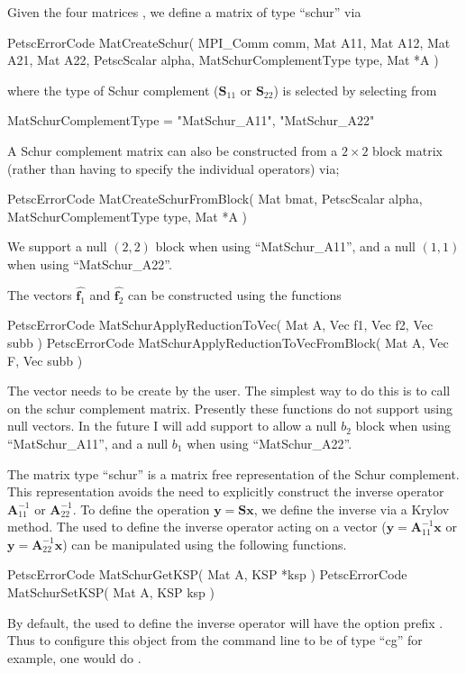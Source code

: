 \documentclass[10pt,a4paper]{amsart}
\renewcommand{\v}[1]{\boldsymbol{#1}}		%
\newcommand{\m}[1]{\boldsymbol{#1}}		%
\newcommand{\code}[1]{{\fontfamily{txtt}\selectfont {#1}}}
\begin{document}
Given the four matrices \code{A11, A12, A21, A22}, we define a matrix of type ``schur'' via
\begin{verbatimtab}[4]
	PetscErrorCode MatCreateSchur( MPI_Comm comm, 
		Mat A11, Mat A12, Mat A21, Mat A22, 
		PetscScalar alpha, MatSchurComplementType type, Mat *A )
\end{verbatimtab}
where the type of Schur complement ($\m S_{11}$ or $\m S_{22}$) is selected by selecting from 
\begin{verbatimtab}[4]
	MatSchurComplementType = { "MatSchur_A11", "MatSchur_A22" }
\end{verbatimtab}
A Schur complement matrix can also be constructed from a $2 \times 2$ block matrix (rather than having to specify the individual operators) via;
\begin{verbatimtab}[4]
	PetscErrorCode MatCreateSchurFromBlock( Mat bmat, PetscScalar alpha, 
		MatSchurComplementType type, Mat *A )
\end{verbatimtab}
We support a null $(2,2)$ block when using ``MatSchur\_A11'',  and a null $(1,1)$ when using ``MatSchur\_A22''.

The vectors $\hat{\v f_1}$ and $\hat{\v f_2}$ can be constructed using the functions
\begin{verbatimtab}[4]
	PetscErrorCode MatSchurApplyReductionToVec( Mat A, Vec f1, Vec f2, Vec subb )
	PetscErrorCode MatSchurApplyReductionToVecFromBlock( Mat A, Vec F, Vec subb )
\end{verbatimtab}
The vector \code{subb} needs to be create by the user. The simplest way to do this is to call \code{MatGetVecs(schur, PETSC\_NULL, \&subb )} on the schur complement matrix. 
Presently these functions do not support using null vectors. In the future I will add support to allow a null  $b_2$ block when using ``MatSchur\_A11'',  and a null $b_1$ when using ``MatSchur\_A22''.

The matrix type ``schur'' is a matrix free representation of the Schur complement. This representation avoids the need to explicitly construct the inverse operator $\m A_{11}^{-1}$ or $\m A_{22}^{-1}$. To define the operation $\v y = \m S \v x$, we define the inverse via a Krylov method. The \code{KSP} used to define the inverse operator acting on a vector ($\v y = \m A_{11}^{-1} \v x$ or $\v y = \m A_{22}^{-1} \v x$) can be manipulated using the following functions.
\begin{verbatimtab}[4]
	PetscErrorCode MatSchurGetKSP( Mat A, KSP *ksp )
	PetscErrorCode MatSchurSetKSP( Mat A, KSP ksp )
\end{verbatimtab}
By default, the \code{KSP} used to define the inverse operator will have the option prefix \code{"mat\_schur\_"}. Thus to configure this object from the command line to be of type ``cg'' for example, one would do \code{-mat\_schur\_ksp\_type cg}.
\end{document}
